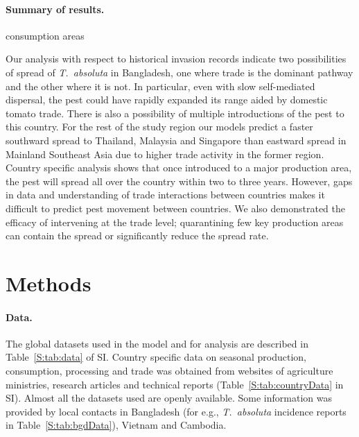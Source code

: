 \documentclass[11pt]{article}
\newcommand{\tuta}{\emph{T.~absoluta}}
\theoremstyle{definition}
\begin{document}
\paragraph{Summary of results.} 

consumption areas

Our analysis with respect to historical invasion records indicate two
possibilities of spread of \tuta{} in Bangladesh, one where trade is the
dominant pathway and the other where it is not. In particular, even with
slow self-mediated dispersal, the pest could have rapidly expanded its
range aided by domestic tomato trade.  There is also a possibility of
multiple introductions of the pest to this country. For the rest of the
study region our models predict a faster southward spread to Thailand,
Malaysia and Singapore than eastward spread in Mainland Southeast Asia due
to higher trade activity in the former region. Country specific analysis
shows that once introduced to a major production area, the pest will spread
all over the country within two to three years. However, gaps in data and
understanding of trade interactions between countries makes it difficult to
predict pest movement between countries. We also demonstrated the efficacy
of intervening at the trade level; quarantining few key production areas
can contain the spread or significantly reduce the spread rate.

\section{Methods}
\paragraph{Data.} The global datasets used in the model and for analysis are
described in Table~\ref{S:tab:data} of SI. Country specific data on
seasonal production, consumption, processing and trade was
obtained from websites of agriculture ministries, research articles and technical
reports (Table~\ref{S:tab:countryData} in SI). Almost
all the datasets used are openly available. Some information was
provided by local contacts in Bangladesh (for e.g., \tuta{} incidence
reports in Table~\ref{S:tab:bgdData}), Vietnam and Cambodia.
\end{document}

